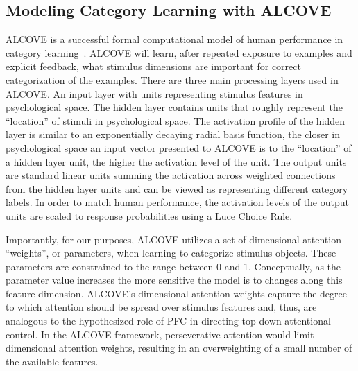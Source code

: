 \subsection{Modeling Category Learning with ALCOVE}
ALCOVE is a successful formal computational model of human performance in category learning~\cite{RefWorks:114}.  ALCOVE will learn, after repeated exposure to examples and explicit feedback, what stimulus dimensions are important for correct categorization of the examples.  There are three main processing layers used in ALCOVE. An input layer with units representing stimulus features in psychological space.  The hidden layer contains units that roughly represent the ``location'' of stimuli in psychological space.  The activation profile of the hidden layer is similar to an exponentially decaying radial basis function, the closer in psychological space an input vector presented to ALCOVE is to the ``location'' of a hidden layer unit, the higher the activation level of the unit.  The output units are standard linear units summing the activation across weighted connections from the hidden layer units and can be viewed as representing different category labels. In order to match human performance, the activation levels of the output units are scaled to response probabilities using a Luce Choice Rule.

Importantly, for our purposes, ALCOVE utilizes a set of dimensional attention ``weights'', or parameters, when learning to categorize stimulus objects.  These parameters are constrained to the range between 0 and 1. Conceptually, as the parameter value increases the more sensitive the model is to changes along this feature dimension.  ALCOVE's dimensional attention weights capture the degree to which attention should be spread over stimulus features and, thus, are analogous to the hypothesized role of PFC in directing top-down attentional control.  In the ALCOVE framework, perseverative attention would limit dimensional attention weights, resulting in an overweighting of a small number of the available features.  


